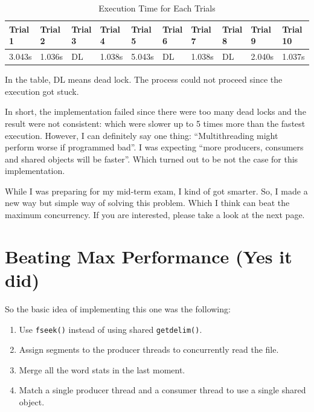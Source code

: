 \documentclass{homework}
\begin{document}
\begin{center}
\begin{table}[h]
\begin{tabularx}{1.0\textwidth} { 
  | >{\centering\arraybackslash}X 
  | >{\centering\arraybackslash}X 
  | >{\centering\arraybackslash}X 
  | >{\centering\arraybackslash}X 
  | >{\centering\arraybackslash}X 
  | >{\centering\arraybackslash}X 
  | >{\centering\arraybackslash}X 
  | >{\centering\arraybackslash}X 
  | >{\centering\arraybackslash}X 
  | >{\centering\arraybackslash}X | }
 \hline
 Trial 1 & Trial 2 & Trial 3 & Trial 4 & Trial 5 & Trial 6 & Trial 7 & Trial 8 & Trial 9 & Trial 10\\
 \hline
 3.043s & 1.036s & DL & 1.038s & 5.043s & DL & 1.038s & DL & 2.040s & 1.037s\\
\hline
\end{tabularx}
\caption{Execution Time for Each Trials}
\end{table}
\end{center}
In the table, DL means dead lock. The process could not proceed since the execution got stuck.
\par

In short, the implementation failed since there were too many dead locks and the result were not consistent: which were slower up to 5 times more than the fastest execution. However, I can definitely say one thing: “Multithreading might perform worse if programmed bad”. I was expecting “more producers, consumers and shared objects will be faster”. Which turned out to be not the case for this implementation. 
\par
While I was preparing for my mid-term exam, I kind of got smarter. So, I made a new way but simple way of solving this problem. Which I think can beat the maximum concurrency. If you are interested, please take a look at the next page.
\pagebreak
\section{Beating Max Performance (Yes it did)} 
So the basic idea of implementing this one was the following:

\begin{enumerate}
   \item Use \texttt{fseek()} instead of using shared \texttt{getdelim()}.
   \item Assign segments to the producer threads to concurrently read the file.
   \item Merge all the word stats in the last moment.
   \item Match a single producer thread and a consumer thread to use a single shared object.
\end{enumerate}
\end{document}
